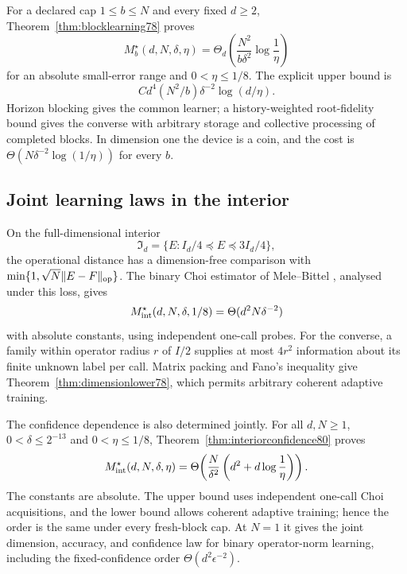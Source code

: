 For a declared cap $1\le b\le N$ and every fixed $d\ge2$,
Theorem~\ref{thm:blocklearning78} proves
\begin{equation}\label{eq:introblock78}
 M_b^\star(d,N,\delta,\eta)
 =\Theta_d\!\left(\frac{N^2}{b\delta^2}\log\frac1\eta\right)
\end{equation}
for an absolute small-error range and $0<\eta\le1/8$.  The
explicit upper bound is
\[
 Cd^4(N^2/b)\delta^{-2}\log(d/\eta).
\]
Horizon blocking gives the common learner; a history-weighted
root-fidelity bound gives the converse with arbitrary storage and
collective processing of completed blocks.  In dimension one the
device is a coin, and the cost is
$\Theta(N\delta^{-2}\log(1/\eta))$ for every $b$.

\subsection{Joint learning laws in the interior}
On the full-dimensional interior
\[
 \mathfrak I_d=\{E:I_d/4\preceq E\preceq3I_d/4\},
\]
the operational distance has a dimension-free comparison with
$\min\{1,\sqrt N\|E-F\|_{\rm op}\}$.  The binary Choi estimator
of Mele--Bittel \cite{MB67}, analysed under this loss, gives
\begin{equation}\label{eq:introinterior78}
 M_{\rm int}^\star(d,N,\delta,1/8)
 =\Theta(d^2N\delta^{-2})
\end{equation}
with absolute constants, using independent one-call probes.  For
the converse, a family within operator radius $r$ of $I/2$
supplies at most $4r^2$ information about its finite unknown label
per call.  Matrix packing and Fano's inequality give
Theorem~\ref{thm:dimensionlower78}, which permits arbitrary coherent
adaptive training.

The confidence dependence is also determined jointly.  For all
$d,N\ge1$, $0<\delta\le2^{-13}$ and $0<\eta\le1/8$,
Theorem~\ref{thm:interiorconfidence80} proves
\begin{equation}\label{eq:introconfidence80}
 M_{\rm int}^{\star}(d,N,\delta,\eta)
 =\Theta\!\left(\frac{N}{\delta^2}
                   \left(d^2+d\log\frac1\eta\right)\right).
\end{equation}
The constants are absolute.  The upper bound uses independent
one-call Choi acquisitions, and the lower bound allows coherent
adaptive training; hence the order is the same under every
fresh-block cap.  At $N=1$ it gives the joint dimension, accuracy,
and confidence law for binary operator-norm learning, including
the fixed-confidence order $\Theta(d^2\epsilon^{-2})$.

